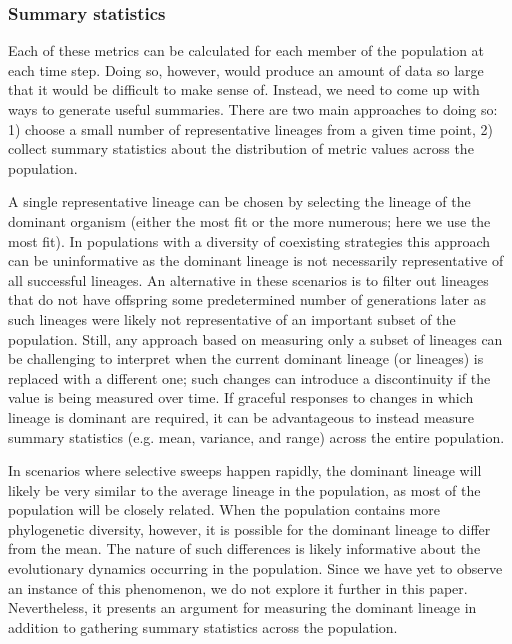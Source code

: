 \documentclass[letterpaper]{article}
\begin{document}


\subsubsection{Summary statistics}

Each of these metrics can be calculated for each member of the population at each time step. Doing so, however, would produce an amount of data so large that it would be difficult to make sense of. Instead, we need to come up with ways to generate useful summaries. There are two main approaches to doing so: 1) choose a small number of representative lineages from a given time point, 2) collect summary statistics about the distribution of metric values across the population.

A single representative lineage can be chosen by selecting the lineage of the dominant organism (either the most fit or the more numerous; here we use the most fit). In populations with a diversity of coexisting strategies this approach can be uninformative as the dominant lineage is not necessarily representative of all successful lineages. An alternative in these scenarios is to filter out lineages that do not have offspring some predetermined number of generations later as such lineages were likely not representative of an important subset of the population. Still, any approach based on measuring only a subset of lineages can be challenging to interpret when the current dominant lineage (or lineages) is replaced with a different one; such changes can introduce a discontinuity if the value is being measured over time. If graceful responses to changes in which lineage is dominant are required, it can be advantageous to instead measure summary statistics (e.g. mean, variance, and range) across the entire population. 

In scenarios where selective sweeps happen rapidly, the dominant lineage will likely be very similar to the average lineage in the population, as most of the population will be closely related. When the population contains more phylogenetic diversity, however, it is possible for the dominant lineage to differ from the mean. The nature of such differences is likely informative about the evolutionary dynamics occurring in the population. Since we have yet to observe an instance of this phenomenon, we do not explore it further in this paper. Nevertheless, it presents an argument for measuring the dominant lineage in addition to gathering summary statistics across the population.
\end{document}
